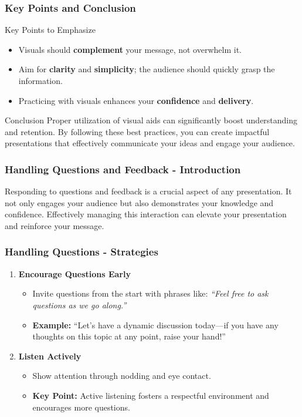 \documentclass[aspectratio=169]{beamer}
\begin{document}
\begin{frame}[fragile]
    \frametitle{Key Points and Conclusion}
    \begin{block}{Key Points to Emphasize}
        \begin{itemize}
            \item Visuals should \textbf{complement} your message, not overwhelm it.
            \item Aim for \textbf{clarity} and \textbf{simplicity}; the audience should quickly grasp the information.
            \item Practicing with visuals enhances your \textbf{confidence} and \textbf{delivery}.
        \end{itemize}
    \end{block}

    \begin{block}{Conclusion}
        Proper utilization of visual aids can significantly boost understanding and retention. By following these best practices, you can create impactful presentations that effectively communicate your ideas and engage your audience.
    \end{block}
\end{frame}

\begin{frame}[fragile]
    \frametitle{Handling Questions and Feedback - Introduction}
    Responding to questions and feedback is a crucial aspect of any presentation. It not only engages your audience but also demonstrates your knowledge and confidence. 
    Effectively managing this interaction can elevate your presentation and reinforce your message.
\end{frame}

\begin{frame}[fragile]
    \frametitle{Handling Questions - Strategies}
    \begin{enumerate}
        \item \textbf{Encourage Questions Early}
            \begin{itemize}
                \item Invite questions from the start with phrases like: 
                \textit{“Feel free to ask questions as we go along.”}
                
                \item \textbf{Example:} “Let’s have a dynamic discussion today—if you have any thoughts on this topic at any point, raise your hand!”
            \end{itemize}

        \item \textbf{Listen Actively}
            \begin{itemize}
                \item Show attention through nodding and eye contact.
                \item \textbf{Key Point:} Active listening fosters a respectful environment and encourages more questions.
            \end{itemize}
    \end{enumerate}
\end{frame}
\end{document}
